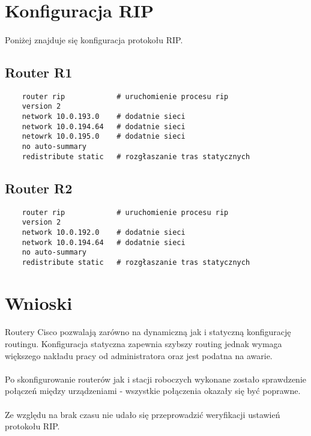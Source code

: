\documentclass[wide,a4paper,titlepage,12pt] {article}
\begin{document}
  \section{Konfiguracja RIP}
  \paragraph{}
  Poniżej znajduje się konfiguracja protokołu RIP.

  \subsection{Router R1}
  \begin{verbatim}
    router rip            # uruchomienie procesu rip
    version 2
    network 10.0.193.0    # dodatnie sieci
    network 10.0.194.64   # dodatnie sieci
    netowrk 10.0.195.0    # dodatnie sieci
    no auto-summary
    redistribute static   # rozgłaszanie tras statycznych
  \end{verbatim}

  \subsection{Router R2}
  \begin{verbatim}
    router rip            # uruchomienie procesu rip
    version 2
    network 10.0.192.0    # dodatnie sieci
    network 10.0.194.64   # dodatnie sieci
    no auto-summary
    redistribute static   # rozgłaszanie tras statycznych
  \end{verbatim}


  \section{Wnioski}
  \paragraph{}
  Routery Cisco pozwalają zarówno na dynamiczną jak i statyczną konfigurację routingu. Konfiguracja statyczna zapewnia szybszy routing jednak wymaga większego nakładu pracy od administratora oraz jest podatna na awarie.

  \paragraph{}
  Po skonfigurowanie routerów jak i stacji roboczych wykonane zostało sprawdzenie połączeń między urządzeniami - wszystkie połączenia okazały się być poprawne.

  \paragraph{}
  Ze względu na brak czasu nie udało się przeprowadzić weryfikacji ustawień protokołu RIP.
\end{document}
